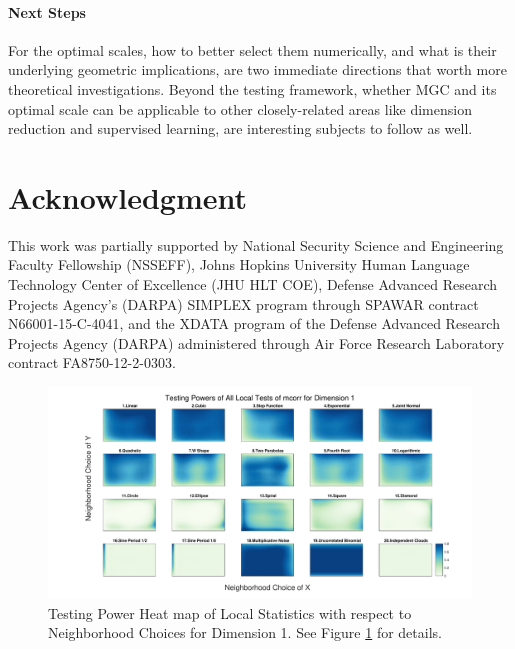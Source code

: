 \documentclass[11pt]{article}
\newcommand{\jv}[1]{{\color{red}{#1}}}
\newcommand{\cs}[1]{{\color{blue}{#1}}}
\begin{document}
\paragraph{Next Steps}
For the optimal scales, how to better select them numerically, and what is their underlying geometric implications, are two immediate directions that worth more theoretical investigations. Beyond the testing framework, whether MGC and its optimal scale can be applicable to other closely-related areas like dimension reduction and supervised learning, are interesting subjects to follow as well.




\section*{Acknowledgment}
This work was partially supported by 
% 
National Security Science and Engineering Faculty Fellowship (NSSEFF), 
% 
Johns Hopkins University Human Language Technology Center of Excellence (JHU HLT COE), 
% 
Defense Advanced Research Projects Agency's (DARPA) SIMPLEX program through SPAWAR contract N66001-15-C-4041, 
% 
and the XDATA program of the Defense Advanced Research Projects Agency (DARPA) administered through Air Force Research Laboratory contract FA8750-12-2-0303.



\appendix
\setcounter{figure}{0}
\renewcommand\thefigure{\arabic{figure}} 


\begin{figure}[htbp]
\includegraphics[width=1.0\textwidth]{../Figures/Fig2}
\caption{Testing Power Heat map of Local Statistics with respect to Neighborhood Choices for Dimension 1. See Figure \ref{figSim2} for details. \jv{fix (1,1) here too please?}
\cs{do you mean the smallest scale should be at the lowest left corner? it is already the case here. }
}
\label{figSim2}
\end{figure}
\end{document}

